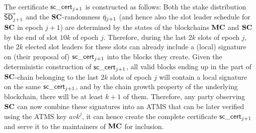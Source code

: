The certificate $\mathsf{sc\_cert}_{j+1}$ is constructed as follows:
Both the stake distribution
$\mathsf{\overline{SD}}^*_{j+1}$ and the $\mathbf{SC}$-randomness $\bar{\eta}_{j+1}$ (and hence also the slot leader
schedule for $\mathbf{SC}$ in epoch $j+1$)
are determined by the states of
the blockchains $\mathbf{MC}$ and $\mathbf{SC}$ by the end of slot $10k$ of epoch $j$.
Therefore, during the last $2k$ slots of epoch $j$, the $2k$ elected slot
leaders for these slots can already include a (local) signature on (their
proposal of) $\mathsf{sc\_cert}_{j+1}$ into the blocks they create. Given the
deterministic construction of $\mathsf{sc\_cert}_{j+1}$, all valid blocks ending up in
the part of $\mathbf{SC}$-chain belonging to the last $2k$ slots of epoch $j$ will
contain a local signature on the same $\mathsf{sc\_cert}_{j+1}$,
and by the chain growth
property of the underlying blockchain, there will be at least $k+1$ of them.
Therefore, any party
observing $\mathbf{SC}$ can now combine these signatures into an ATMS that can be later
verified using the ATMS key $avk^j$, it can hence create the complete certificate
$\mathsf{sc\_cert}_{j+1}$ and serve it to the maintainers of $\mathbf{MC}$ for inclusion.





